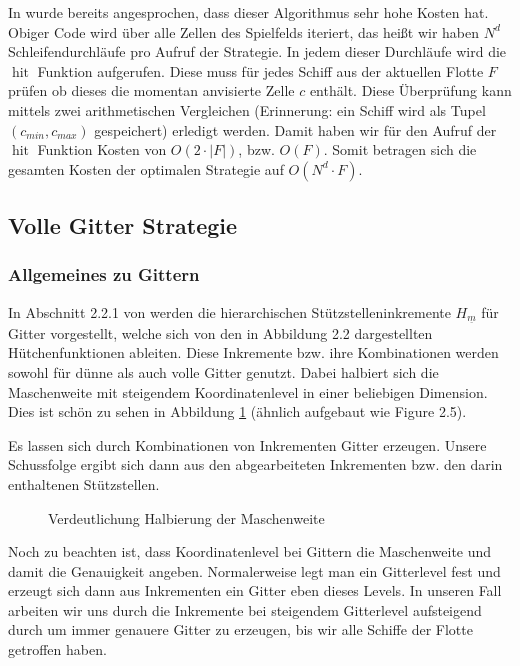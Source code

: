 \documentclass[a4paper,12pt]{llncs}
\numberwithin{equation}{section}
\DeclareMathOperator{\hit}{hit}
\begin{document}
In \cite{M13} wurde bereits angesprochen, dass dieser Algorithmus sehr hohe Kosten hat. Obiger Code wird über alle Zellen des Spielfelds iteriert, das heißt wir haben $N^d$ Schleifendurchläufe pro Aufruf der Strategie. In jedem dieser Durchläufe wird die $\hit$ Funktion aufgerufen. Diese muss für jedes Schiff aus der aktuellen Flotte $F$ prüfen ob dieses die momentan anvisierte Zelle $c$ enthält. Diese Überprüfung kann mittels zwei arithmetischen Vergleichen (Erinnerung: ein Schiff wird als Tupel $(c_{min},c_{max})$ gespeichert) erledigt werden. Damit haben wir für den Aufruf der $\hit$ Funktion Kosten von $O(2\cdot |F|)$, bzw. $O(F)$. Somit betragen sich die gesamten Kosten der optimalen Strategie auf $O(N^d\cdot F)$.
 

\subsection{Volle Gitter Strategie}

\subsubsection{Allgemeines zu Gittern}

In Abschnitt 2.2.1 von \cite{M13} werden die hierarchischen Stützstelleninkremente $H_{\underline{m}}$ für Gitter vorgestellt, welche sich von den in \cite{M13} Abbildung 2.2 dargestellten Hütchenfunktionen ableiten. Diese Inkremente bzw. ihre Kombinationen werden sowohl für dünne als auch volle Gitter genutzt. Dabei halbiert sich die Maschenweite mit steigendem Koordinatenlevel in einer beliebigen Dimension. Dies ist schön zu sehen in Abbildung \ref{fig:gitter01} (ähnlich aufgebaut wie \cite{P10} Figure 2.5).

Es lassen sich durch Kombinationen von Inkrementen Gitter erzeugen. Unsere Schussfolge ergibt sich dann aus den abgearbeiteten Inkrementen bzw. den darin enthaltenen Stützstellen. 

\begin{figure}
	\centering
	\resizebox{90mm}{!}{}
	\caption{Verdeutlichung Halbierung der Maschenweite}
	\label{fig:gitter01}
\end{figure}


Noch zu beachten ist, dass Koordinatenlevel bei Gittern die Maschenweite und damit die Genauigkeit angeben. Normalerweise legt man ein Gitterlevel fest und erzeugt sich dann aus Inkrementen ein Gitter eben dieses Levels. In unseren Fall arbeiten wir uns durch die Inkremente bei steigendem Gitterlevel aufsteigend durch um immer genauere Gitter zu erzeugen, bis wir alle Schiffe der Flotte getroffen haben.
\end{document}
